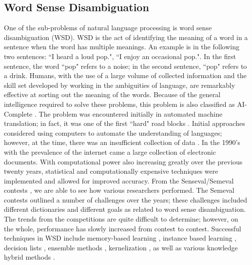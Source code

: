 \subsection{Word Sense Disambiguation}

One of the sub-problems of natural language processing
is word sense disambiguation (WSD).  WSD is the act of identifying the meaning
of a word in a sentence when the word has multiple meanings.  An example is in
the following two sentences: ``I heard a loud pop.", ``I enjoy an occasional
pop.".  In the first sentence, the word ``pop" refers to a noise; in the second
sentence, ``pop" refers to a drink.  Humans, with the use of a large volume of
collected information and the skill set developed by working in the ambiguities
of language, are remarkably effective at sorting out the meaning of the words.
Because of the general intelligence required to solve these problems, this
problem is also classified as AI-Complete \cite{BARHILL}.   The problem was
encountered initially in automated machine translation; in fact, it was one of
the first ``hard" road blocks \cite{WSDAS}.  Initial approaches considered using
computers to automate the understanding of languages; however, at the time,
there was an insufficient collection of data \cite{WSDAS}.  In the 1990's with
the prevalence of the internet came a large collection of electronic documents.
With computational power also increasing greatly over the previous twenty years,
statistical and computationally expensive techniques were implemented and
allowed for improved accuracy.  From the Senseval/Semeval contests
\cite{SEMEVAL}, we are able to see how various researchers performed.  The
Semeval contests outlined a number of challenges over the years; these
challenges included different dictionaries and different goals as related to
word sense disambiguation.  The trends from the competitions are quite difficult
to determine; however, on the whole, performance has slowly increased from
contest to contest.  Successful techniques in WSD include memory-based learning
\cite{GAMBL, PARAM_OPT, MEM-BASED}, instance based learning
\cite{INSTANCE_LEARN}, decision lists \cite{YarrowskyDL}, ensemble methods
\cite{ENSEMBLE}, kernelization \cite{KERNEL}, as well as various knowledge
hybrid methods \cite{HAWKWSD}.  

